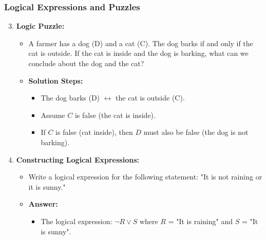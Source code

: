 \documentclass[aspectratio=169]{beamer}
\begin{document}
\begin{frame}[fragile]
    \frametitle{Logical Expressions and Puzzles}
    \begin{enumerate}
        \setcounter{enumi}{2}
        \item \textbf{Logic Puzzle:}
        \begin{itemize}
            \item A farmer has a dog (D) and a cat (C). The dog barks if and only if the cat is outside. If the cat is inside and the dog is barking, what can we conclude about the dog and the cat?
            \item \textbf{Solution Steps:}
            \begin{itemize}
                \item The dog barks (D) $\leftrightarrow$ the cat is outside (C).
                \item Assume $C$ is false (the cat is inside).
                \item If $C$ is false (cat inside), then $D$ must also be false (the dog is not barking).
            \end{itemize}
        \end{itemize}
        
        \item \textbf{Constructing Logical Expressions:}
        \begin{itemize}
            \item Write a logical expression for the following statement: "It is not raining or it is sunny."
            \item \textbf{Answer:}
            \begin{itemize}
                \item The logical expression: $\neg R \lor S$ where $R$ = "It is raining" and $S$ = "It is sunny".
            \end{itemize}
        \end{itemize}
    \end{enumerate}
\end{frame}
\end{document}
